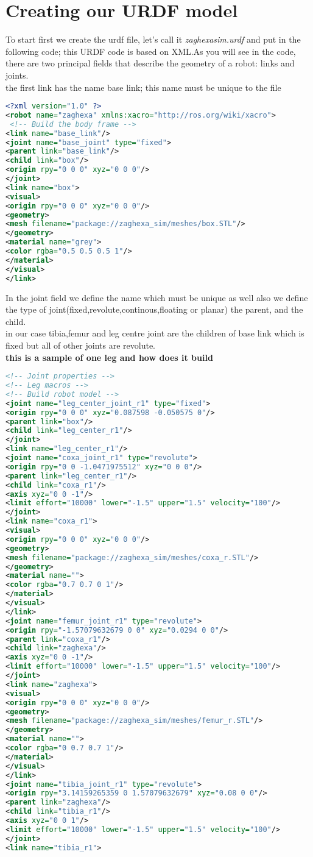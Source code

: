 \section{Creating our URDF model}
To start first we create the urdf file, let's call it\textit{ zaghexasim.urdf} and put in
the following code; this URDF code is based on XML.As you will see in the code, there are two principal fields that describe the geometry of a robot: links and joints.\\
the first link has the name base link; this name must be unique to the file\\
\begin{lstlisting}[language=XML]
<?xml version="1.0" ?>
<robot name="zaghexa" xmlns:xacro="http://ros.org/wiki/xacro">
 <!-- Build the body frame -->
<link name="base_link"/>
<joint name="base_joint" type="fixed">
<parent link="base_link"/>
<child link="box"/>
<origin rpy="0 0 0" xyz="0 0 0"/>
</joint>
<link name="box">
<visual>
<origin rpy="0 0 0" xyz="0 0 0"/>
<geometry>
<mesh filename="package://zaghexa_sim/meshes/box.STL"/>
</geometry>
<material name="grey">
<color rgba="0.5 0.5 0.5 1"/>
</material>
</visual>
</link>
\end{lstlisting}
In the joint field we define the name which must be unique as well also we define 
the type of joint(fixed,revolute,continous,floating or planar) the parent, and the child.\\
in our case tibia,femur and leg centre joint are the children of base link which is fixed but all of other joints are revolute.\\
\textbf{this is a sample of one leg and how does it build}\\
\begin{lstlisting}[language=XML]
<!-- Joint properties -->
<!-- Leg macros -->
<!-- Build robot model -->
<joint name="leg_center_joint_r1" type="fixed">
<origin rpy="0 0 0" xyz="0.087598 -0.050575 0"/>
<parent link="box"/>
<child link="leg_center_r1"/>
</joint>
<link name="leg_center_r1"/>
<joint name="coxa_joint_r1" type="revolute">
<origin rpy="0 0 -1.0471975512" xyz="0 0 0"/>
<parent link="leg_center_r1"/>
<child link="coxa_r1"/>
<axis xyz="0 0 -1"/>
<limit effort="10000" lower="-1.5" upper="1.5" velocity="100"/>
</joint>
<link name="coxa_r1">
<visual>
<origin rpy="0 0 0" xyz="0 0 0"/>
<geometry>
<mesh filename="package://zaghexa_sim/meshes/coxa_r.STL"/>
</geometry>
<material name="">
<color rgba="0.7 0.7 0 1"/>
</material>
</visual>
</link>
<joint name="femur_joint_r1" type="revolute">
<origin rpy="-1.57079632679 0 0" xyz="0.0294 0 0"/>
<parent link="coxa_r1"/>
<child link="zaghexa"/>
<axis xyz="0 0 -1"/>
<limit effort="10000" lower="-1.5" upper="1.5" velocity="100"/>
</joint>
<link name="zaghexa">
<visual>
<origin rpy="0 0 0" xyz="0 0 0"/>
<geometry>
<mesh filename="package://zaghexa_sim/meshes/femur_r.STL"/>
</geometry>
<material name="">
<color rgba="0 0.7 0.7 1"/>
</material>
</visual>
</link>
<joint name="tibia_joint_r1" type="revolute">
<origin rpy="3.14159265359 0 1.57079632679" xyz="0.08 0 0"/>
<parent link="zaghexa"/>
<child link="tibia_r1"/>
<axis xyz="0 0 1"/>
<limit effort="10000" lower="-1.5" upper="1.5" velocity="100"/>
</joint>
<link name="tibia_r1">
\end{lstlisting}
